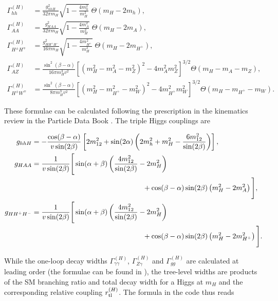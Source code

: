\documentclass[aps,superscriptaddress,nofootinbib,floatfix,notitlepage]{revtex4-1}
\begin{document}
\begin{align}
 \Gamma ^{(H)}_{hh} &= \frac{g_{hhH}^2}{32 \pi m_H } \sqrt{1 - \frac{4 m_h^2}{m_H^2}} \; \Theta (m_H-2m_h), \nonumber \\
 \Gamma ^{(H)}_{AA} &= \frac{g_{HAA}^2}{32 \pi m_H } \sqrt{1 - \frac{4 m_A^2}{m_H^2}} \; \Theta (m_H-2m_A), \nonumber \\
 \Gamma ^{(H)}_{H^\pm H^\mp} &= \frac{g_{HH^+H^-}^2}{16 \pi m_H } \sqrt{1 - \frac{4 m_{H^+}^2}{m_H^2}} \; \Theta (m_H-2m_{H^+}), \nonumber \\
 \Gamma ^{(H)}_{AZ} &= \frac{\sin^2 (\beta -\alpha )}{16 \pi m_H^3 v^2} \left[ (m_H^2-m_A^2-m_Z^2)^2-4 m_A^2 m_Z^2\right] ^{3/2}  \Theta (m_H-m_A-m_Z), \nonumber \\
 \Gamma ^{(H)}_{H^\pm W^\mp } &= \frac{\sin^2 (\beta -\alpha )}{8 \pi m_H^3 v^2} \left[ (m_H^2-m_{H^+}^2-m_W^2)^2-4 m_{H^+}^2 m_W^2\right] ^{3/2}  \Theta (m_H-m_{H^+}-m_W). \nonumber 
\end{align}

These formulae can be calculated following the prescription in the kinematics review in the Particle Data Book \cite{Agashe:2014kda}. The triple Higgs couplings are

\begin{align}
 g_{hhH} &= -\frac{\cos(\beta-\alpha)}{v \sin (2\beta)} \left[ 2 m_{12}^2 +\sin (2\alpha) \left( 2 m_h^2 + m_H^2 - \frac{6 m_{12}^2}{\sin (2\beta)} \right) \right] ,\nonumber \\
 g_{HAA} &= \frac{1}{v \sin (2\beta)} \Bigg[ \sin(\alpha+\beta) \left( \frac{4 m_{12}^2}{\sin (2\beta)} -2 m_H^2 \right) \phantom{\Bigg]}\nonumber \\
 & \hspace*{150pt} \phantom{\Bigg[} + \cos(\beta-\alpha) \sin (2\beta) \left( m_H^2 -2 m_A^2 \right) \Bigg] ,\nonumber \\
 g_{HH^+H^-} &= \frac{1}{v \sin (2\beta)} \Bigg[ \sin(\alpha+\beta) \left( \frac{4 m_{12}^2}{\sin (2\beta)} -2 m_H^2 \right) \phantom{\Bigg]}\nonumber \\
 & \hspace*{150pt} \phantom{\Bigg[} +\cos(\beta-\alpha) \sin (2\beta) \left( m_H^2 -2 m_{H^+}^2 \right) \Bigg] .\nonumber
\end{align}


While the one-loop decay widths $\Gamma_{\gamma \gamma}^{(H)}$, $\Gamma_{Z \gamma}^{(H)}$ and $\Gamma_{gg}^{(H)}$ are calculated at leading order (the formulae can be found in \cite{Gunion:1989we}), the tree-level widths are products of the SM branching ratio and total decay width for a Higgs at $m_H$ and the corresponding relative coupling $r_{\rm tl}^{(H)}$.
The formula in the code thus reads
\end{document}
